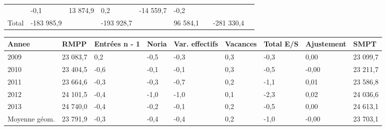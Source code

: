 \begin{longtable}[]{@{}lllllllll@{}}
\begin{minipage}[t]{0.16\columnwidth}
\end{minipage} & \begin{minipage}[t]{0.06\columnwidth}\raggedright
-0,1\strut
\end{minipage} & \begin{minipage}[t]{0.12\columnwidth}\raggedright
13 874,9\strut
\end{minipage} & \begin{minipage}[t]{0.06\columnwidth}\raggedright
0,2\strut
\end{minipage} & \begin{minipage}[t]{0.09\columnwidth}\raggedright
-14 559,7\strut
\end{minipage} & \begin{minipage}[t]{0.06\columnwidth}\raggedright
-0,2\strut
\end{minipage}\tabularnewline
\begin{minipage}[t]{0.05\columnwidth}\raggedright
Total\strut
\end{minipage} & \begin{minipage}[t]{0.10\columnwidth}\raggedright
-183 985,9\strut
\end{minipage} & \begin{minipage}[t]{0.06\columnwidth}\raggedright
\strut
\end{minipage} & \begin{minipage}[t]{0.16\columnwidth}\raggedright
-193 928,7\strut
\end{minipage} & \begin{minipage}[t]{0.06\columnwidth}\raggedright
\strut
\end{minipage} & \begin{minipage}[t]{0.12\columnwidth}\raggedright
96 584,1\strut
\end{minipage} & \begin{minipage}[t]{0.06\columnwidth}\raggedright
\strut
\end{minipage} & \begin{minipage}[t]{0.09\columnwidth}\raggedright
-281 330,4\strut
\end{minipage} & \begin{minipage}[t]{0.06\columnwidth}\raggedright
\strut
\end{minipage}\tabularnewline
\bottomrule
\end{longtable}

\begin{longtable}[]{@{}lllllllll@{}}
\toprule
Annee & RMPP & Entrées n - 1 & Noria & Var. effectifs & Vacances & Total
E/S & Ajustement & SMPT\tabularnewline
\midrule
\endhead
2009 & 23 083,7 & 0,2 & -0,5 & -0,3 & 0,3 & -0,3 & 0,00 & 23
099,7\tabularnewline
2010 & 23 404,5 & -0,6 & -0,1 & -0,1 & 0,3 & -0,5 & -0,00 & 23
211,7\tabularnewline
2011 & 23 664,6 & -0,3 & -0,3 & -0,7 & 0,2 & -1,1 & 0,01 & 23
586,8\tabularnewline
2012 & 24 101,5 & -0,4 & -1,0 & -1,0 & 0,1 & -2,3 & 0,02 & 24
036,6\tabularnewline
2013 & 24 740,0 & -0,4 & -0,2 & -0,1 & 0,2 & -0,5 & 0,00 & 24
613,1\tabularnewline
Moyenne géom. & 23 791,9 & -0,3 & -0,4 & -0,4 & 0,2 & -1,0 & -0,00 & 23
703,1\tabularnewline
\bottomrule
\end{longtable}

